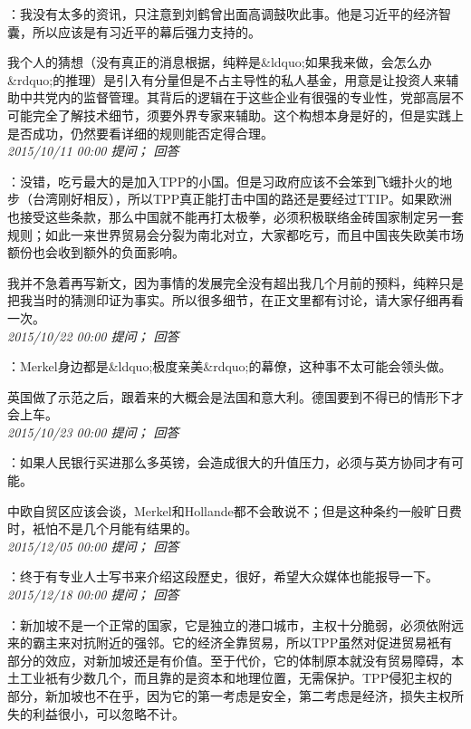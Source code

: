 \documentclass[twocolumn]{ctexart}
\begin{document}
：我没有太多的资讯，只注意到刘鹤曾出面高调鼓吹此事。他是习近平的经济智囊，所以应该是有习近平的幕后强力支持的。

我个人的猜想（没有真正的消息根据，纯粹是\&ldquo;如果我来做，会怎么办\&rdquo;的推理）是引入有分量但是不占主导性的私人基金，用意是让投资人来辅助中共党内的监督管理。其背后的逻辑在于这些企业有很强的专业性，党部高层不可能完全了解技术细节，须要外界专家来辅助。这个构想本身是好的，但是实践上是否成功，仍然要看详细的规则能否定得合理。\\

\textit{\hfill\noindent\small 2015/10/11 00:00 提问； 回答}

：没错，吃亏最大的是加入TPP的小国。但是习政府应该不会笨到飞蛾扑火的地步（台湾刚好相反），所以TPP真正能打击中国的路还是要经过TTIP。如果欧洲也接受这些条款，那么中国就不能再打太极拳，必须积极联络金砖国家制定另一套规则；如此一来世界贸易会分裂为南北对立，大家都吃亏，而且中国丧失欧美市场额份也会收到额外的负面影响。

我并不急着再写新文，因为事情的发展完全没有超出我几个月前的预料，纯粹只是把我当时的猜测印证为事实。所以很多细节，在正文里都有讨论，请大家仔细再看一次。\\

\textit{\hfill\noindent\small 2015/10/22 00:00 提问； 回答}

：Merkel身边都是\&ldquo;极度亲美\&rdquo;的幕僚，这种事不太可能会领头做。

英国做了示范之后，跟着来的大概会是法国和意大利。德国要到不得已的情形下才会上车。\\

\textit{\hfill\noindent\small 2015/10/23 00:00 提问； 回答}

：如果人民银行买进那么多英镑，会造成很大的升值压力，必须与英方协同才有可能。

中欧自贸区应该会谈，Merkel和Hollande都不会敢说不；但是这种条约一般旷日费时，衹怕不是几个月能有结果的。\\

\textit{\hfill\noindent\small 2015/12/05 00:00 提问； 回答}

：终于有专业人士写书来介绍这段歷史，很好，希望大众媒体也能报导一下。\\

\textit{\hfill\noindent\small 2015/12/18 00:00 提问； 回答}

：新加坡不是一个正常的国家，它是独立的港口城市，主权十分脆弱，必须依附远来的霸主来对抗附近的强邻。它的经济全靠贸易，所以TPP虽然对促进贸易衹有部分的效应，对新加坡还是有价值。至于代价，它的体制原本就没有贸易障碍，本土工业衹有少数几个，而且靠的是资本和地理位置，无需保护。TPP侵犯主权的部分，新加坡也不在乎，因为它的第一考虑是安全，第二考虑是经济，损失主权所失的利益很小，可以忽略不计。
\end{document}
